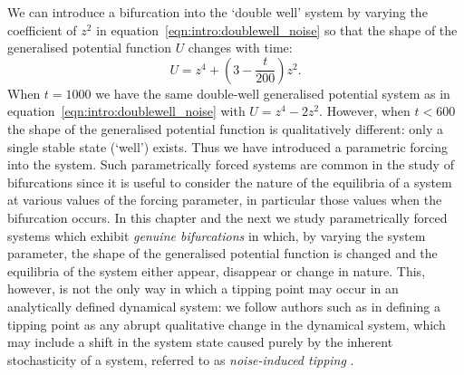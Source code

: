 We can introduce a bifurcation into the `double well' system by varying the coefficient of $z^2$ in equation~\ref{eqn:intro:doublewell_noise} so that the shape of the generalised potential function $U$ changes with time:
	\begin{equation}
		\label{eqn:intro:PitchforkPotential}
		U = z^4 + \left(3-\frac{t}{200}\right)z^2.
	\end{equation}
When $t=1000$ we have the same double-well generalised potential system as in equation~\ref{eqn:intro:doublewell_noise} with $U = z^4 -2 z^2$. However, when $t<600$ the shape of the generalised potential function is qualitatively different: only a single stable state (`well') exists. {\Red Thus we have introduced a parametric forcing into the system. Such parametrically forced systems are common in the study of bifurcations \citep{strogatz2014} since it is useful to consider the nature of the equilibria of a system at various values of the forcing parameter, in particular those values when the bifurcation occurs. In this chapter and the next we study parametrically forced systems which exhibit \emph{genuine bifurcations} in which, by varying the system parameter, the shape of the generalised potential function is changed and the equilibria of the system either appear, disappear or change in nature. This, however, is not the only way in which a tipping point may occur in an analytically defined dynamical system: we follow authors such as \cite{scheffer2009} in defining a tipping point as any abrupt qualitative change in the dynamical system, which may include a shift in the system state caused purely by the inherent stochasticity of a system, referred to as \emph{noise-induced tipping} \citep{livina2011,ashwin2012}.}

